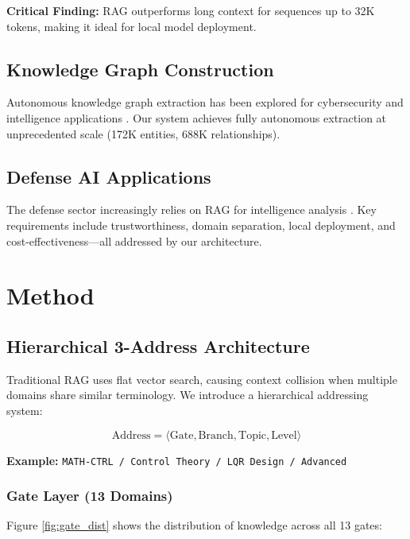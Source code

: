 \documentclass[11pt]{article}
\begin{document}
\textbf{Critical Finding:} RAG outperforms long context for sequences up to 32K tokens, making it ideal for local model deployment.

\subsection{Knowledge Graph Construction}

Autonomous knowledge graph extraction has been explored for cybersecurity \cite{mitre2023cygraph} and intelligence applications \cite{altair2024kg}. Our system achieves fully autonomous extraction at unprecedented scale (172K entities, 688K relationships).

\subsection{Defense AI Applications}

The defense sector increasingly relies on RAG for intelligence analysis \cite{gdit2024rag, ida2024defense}. Key requirements include trustworthiness, domain separation, local deployment, and cost-effectiveness—all addressed by our architecture.

\section{Method}

\subsection{Hierarchical 3-Address Architecture}

Traditional RAG uses flat vector search, causing context collision when multiple domains share similar terminology. We introduce a hierarchical addressing system:

\begin{equation}
\text{Address} = \langle \text{Gate}, \text{Branch}, \text{Topic}, \text{Level} \rangle
\end{equation}

\textbf{Example:} \texttt{MATH-CTRL / Control Theory / LQR Design / Advanced}

\subsubsection{Gate Layer (13 Domains)}

Figure \ref{fig:gate_dist} shows the distribution of knowledge across all 13 gates:
\end{document}
